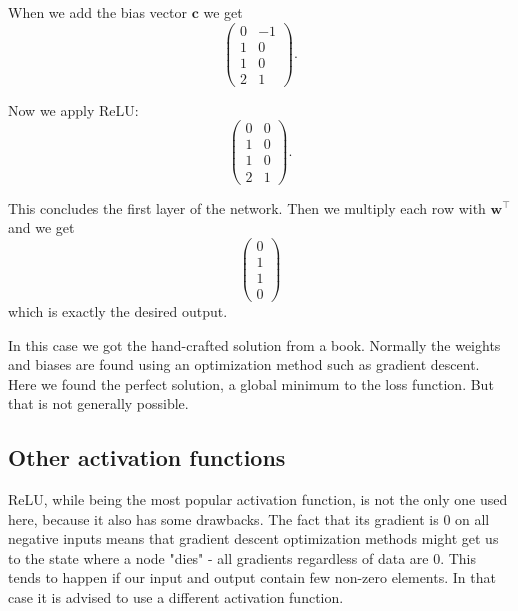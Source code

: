 When we add the bias vector $\textbf{c}$ we get 
$$
\left(\begin{matrix}
	0 & -1\\
	1 & 0\\
	1 & 0\\
	2 & 1
\end{matrix}\right).$$

Now we apply ReLU:
$$
\left(\begin{matrix}
	0 & 0\\
	1 & 0\\
	1 & 0\\
	2 & 1
\end{matrix}\right).$$

This concludes the first layer of the network. Then we multiply each row with $\textbf{w}^\top$ and we get
$$	
\left(\begin{matrix}
	0\\
	1\\
	1\\
	0
\end{matrix}\right)$$
which is exactly the desired output.

In this case we got the hand-crafted solution from a book. Normally the weights and biases are found using an optimization method such as gradient descent. Here we found the perfect solution, a global minimum to the loss function. But that is not generally possible.

\subsection{Other activation functions}
ReLU, while being the most popular activation function, is not the only one used here, because it also has some drawbacks. The fact that its gradient is $0$ on all negative inputs means that gradient descent optimization methods might get us to the state where a node "dies" - all gradients regardless of data are 0. This tends to happen if our input and output contain few non-zero elements. In that case it is advised to use a different activation function.

